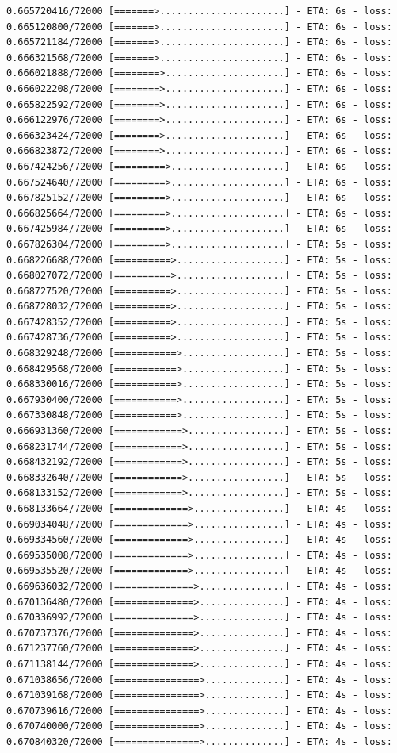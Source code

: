 \documentclass[12pt,fleqn]{article}\usepackage{../../common}
\begin{document}
\begin{verbatim}
0.665720416/72000 [=======>......................] - ETA: 6s - loss: 0.665120800/72000 [=======>......................] - ETA: 6s - loss: 0.665721184/72000 [=======>......................] - ETA: 6s - loss: 0.666321568/72000 [=======>......................] - ETA: 6s - loss: 0.666021888/72000 [========>.....................] - ETA: 6s - loss: 0.666022208/72000 [========>.....................] - ETA: 6s - loss: 0.665822592/72000 [========>.....................] - ETA: 6s - loss: 0.666122976/72000 [========>.....................] - ETA: 6s - loss: 0.666323424/72000 [========>.....................] - ETA: 6s - loss: 0.666823872/72000 [========>.....................] - ETA: 6s - loss: 0.667424256/72000 [=========>....................] - ETA: 6s - loss: 0.667524640/72000 [=========>....................] - ETA: 6s - loss: 0.667825152/72000 [=========>....................] - ETA: 6s - loss: 0.666825664/72000 [=========>....................] - ETA: 6s - loss: 0.667425984/72000 [=========>....................] - ETA: 6s - loss: 0.667826304/72000 [=========>....................] - ETA: 5s - loss: 0.668226688/72000 [==========>...................] - ETA: 5s - loss: 0.668027072/72000 [==========>...................] - ETA: 5s - loss: 0.668727520/72000 [==========>...................] - ETA: 5s - loss: 0.668728032/72000 [==========>...................] - ETA: 5s - loss: 0.667428352/72000 [==========>...................] - ETA: 5s - loss: 0.667428736/72000 [==========>...................] - ETA: 5s - loss: 0.668329248/72000 [===========>..................] - ETA: 5s - loss: 0.668429568/72000 [===========>..................] - ETA: 5s - loss: 0.668330016/72000 [===========>..................] - ETA: 5s - loss: 0.667930400/72000 [===========>..................] - ETA: 5s - loss: 0.667330848/72000 [===========>..................] - ETA: 5s - loss: 0.666931360/72000 [============>.................] - ETA: 5s - loss: 0.668231744/72000 [============>.................] - ETA: 5s - loss: 0.668432192/72000 [============>.................] - ETA: 5s - loss: 0.668332640/72000 [============>.................] - ETA: 5s - loss: 0.668133152/72000 [============>.................] - ETA: 5s - loss: 0.668133664/72000 [=============>................] - ETA: 4s - loss: 0.669034048/72000 [=============>................] - ETA: 4s - loss: 0.669334560/72000 [=============>................] - ETA: 4s - loss: 0.669535008/72000 [=============>................] - ETA: 4s - loss: 0.669535520/72000 [=============>................] - ETA: 4s - loss: 0.669636032/72000 [==============>...............] - ETA: 4s - loss: 0.670136480/72000 [==============>...............] - ETA: 4s - loss: 0.670336992/72000 [==============>...............] - ETA: 4s - loss: 0.670737376/72000 [==============>...............] - ETA: 4s - loss: 0.671237760/72000 [==============>...............] - ETA: 4s - loss: 0.671138144/72000 [==============>...............] - ETA: 4s - loss: 0.671038656/72000 [===============>..............] - ETA: 4s - loss: 0.671039168/72000 [===============>..............] - ETA: 4s - loss: 0.670739616/72000 [===============>..............] - ETA: 4s - loss: 0.670740000/72000 [===============>..............] - ETA: 4s - loss: 0.670840320/72000 [===============>..............] - ETA: 4s - loss: 
\end{verbatim}
\end{document}
